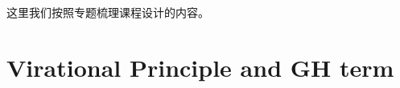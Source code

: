 这里我们按照专题梳理课程设计的内容。
\section{Virational Principle and GH term}\label{sec:Virational Principle and GH term} %








